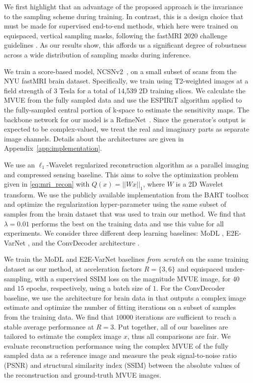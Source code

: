 \documentclass{article}
\begin{document}
We first highlight that an advantage of the proposed approach is the
invariance to the sampling scheme during training. In contrast, this
is a design choice that must be made for supervised end-to-end
methods, which here were trained on equispaced, vertical sampling
masks, following the fastMRI 2020 challenge guidelines
\cite{zbontar2018fastMRI,muckleyfastmri2020}. As our results show,
this affords us a significant degree of robustness across a wide
distribution of sampling masks during inference.

We train a score-based model, NCSNv2~\cite{song2020improved}, on a
small subset of scans from the NYU fastMRI brain dataset.
Specifically, we train using T2-weighted images at a field strength of
3 Tesla for a total of 14,539 2D training slices.  We calculate the
MVUE from the fully sampled data and use the ESPIRiT algorithm
\cite{uecker2014espirit,iyer2020autoespirit} applied to the
fully-sampled central portion of k-space to estimate the sensitivity
maps.  The backbone network for our model is a
RefineNet~\cite{lin2017refinenet}.  Since the generator's output is
expected to be complex-valued, we treat the real and imaginary parts
as separate image channels. Details about the architectures are given
in Appendix~\ref{app:implementation}.


We use an $\ell_1$-Wavelet regularized reconstruction algorithm
\cite{lustig2007sparse} as a parallel imaging and compressed sensing
baseline.  This aims to solve the optimization problem given in
\eqref{eq:mri_recon} with $Q(x) = ||Wx||_1$, where $W$ is a 2D Wavelet
transform.  We use the publicly available implementation from the BART
toolbox \cite{uecker2015berkeley,bart} and optimize the regularization
hyper-parameter using the same subset of samples from the brain
dataset that was used to train our method. We find that $\lambda =
0.01$ performs the best on the training data and use this value for
all experiments.  We consider three different deep learning baselines:
MoDL \cite{aggarwal2018modl}, E2E-VarNet \cite{sriram2020end}, and the
ConvDecoder architecture \cite{darestani2021measuring}. 

We train the MoDL and E2E-VarNet baselines \textit{from scratch} on
the same training dataset as our method, at acceleration factors
$R=\{3,6\}$ and equispaced under-sampling, with a supervised SSIM loss
on the magnitude MVUE image, for $40$ and $15$ epochs, respectively,
using a batch size of $1$. For the ConvDecoder baseline, we use the
architecture for brain data in \cite{darestani2021measuring} that
outputs a complex image estimate and optimize the number of fitting
iterations on a subset of samples from the training data. We find that
$10000$ iterations are sufficient to reach a stable average
performance at $R=3$. Put together, all of our baselines are tailored
to estimate the complex image $x$, thus all comparisons are fair. We
evaluate reconstruction performance using the complex MVUE of the
fully sampled data as a reference image and measure the peak
signal-to-noise ratio (PSNR) and structural similarity index (SSIM)
\cite{wang2006modern} between the absolute values of the
reconstruction and ground-truth MVUE images.
\end{document}
